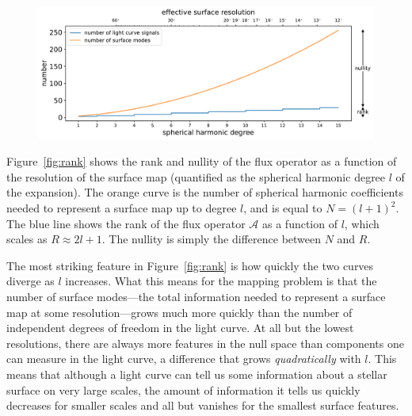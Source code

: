 \documentclass[modern]{aastex62}
\begin{document}
\begin{figure}[t!]
    \begin{centering}
        \includegraphics[width=\linewidth]{figures/rank.pdf}
    \end{centering}
\end{figure}

Figure~\ref{fig:rank} shows the rank and nullity of the flux operator
as a function of the resolution of the surface map (quantified as the
spherical harmonic degree $l$ of the expansion). The orange
curve is the number of spherical harmonic coefficients needed to
represent a surface map up to degree $l$, and is equal to $N = (l + 1)^2$.
The blue line shows the rank of the flux operator $\pmb{\mathcal{A}}$ as a function
of $l$, which scales as $R \approx 2l + 1$. The nullity is
simply the difference between $N$ and $R$.

The most striking feature in Figure~\ref{fig:rank} is how quickly the two
curves diverge as $l$ increases. What this means for the mapping problem
is that the number of surface modes---the total information needed to
represent a surface map at some resolution---grows much more quickly than the
number of independent degrees of freedom in the light curve.
%
At all but the lowest resolutions, there are always more features in the
null space than components one can measure in the light curve, a difference
that grows \emph{quadratically} with $l$.
%
This means that although a light curve can tell us some information about
a stellar surface on very large scales, the amount of information it tells
us quickly decreases for smaller scales and all but vanishes for the smallest
surface features.
\end{document}
